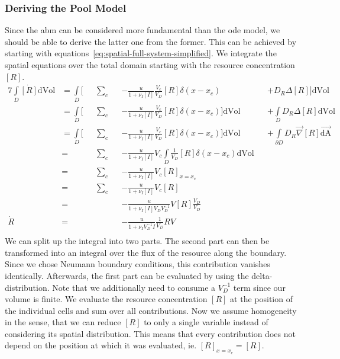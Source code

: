 \documentclass[10pt,twocolumn,5p]{elsarticle}
\numberwithin{equation}{section}
\begin{document}
\subsubsection*{Deriving the Pool Model}
\label{subsec:supplement-deriving-pool-odes}
Since the \ac{abm} can be considered more fundamental than the \ac{ode} model, we should be able to derive the latter one from the former.
This can be achieved by starting with equations~\eqref{eq:spatial-full-system-simplified}.
We integrate the spatial equations over the total domain starting with the resource concentration $[R]$.
\begin{alignat}{7}
    \int\limits_D\dot{[R]}\text{dVol} 
    &= \int\limits_D\bigg[&&\sum\limits_c &&-\frac{u}{1+\nu_I [I]} \frac{V_c}{V_D} [R] \delta(x-x_c) &&+ D_R\Delta [R]\bigg]\text{dVol}\\
    &= \int\limits_D\bigg[&&\sum\limits_c &&-\frac{u}{1+\nu_I [I]} \frac{V_c}{V_D} [R] \delta(x-x_c)\bigg]\text{dVol} &&+ \int\limits_D D_R\Delta [R]\text{dVol}\\
    &= \int\limits_D\bigg[&&\sum\limits_c &&-\frac{u}{1+\nu_I [I]} \frac{V_c}{V_D} [R] \delta(x-x_c)\bigg]\text{dVol} &&+ \int\limits_{\partial D} D_R\vec{\nabla} [R]\vec{\text{dA}}\\
    &= &&\sum\limits_c &&-\frac{u}{1+\nu_I [I]} V_c \int\limits_D \frac{1}{V_D} [R] \delta(x-x_c)\text{dVol}\\
    &= &&\sum\limits_c &&-\frac{u}{1+\nu_I [I]} V_c [R]_{x=x_c}\\
    &= &&\sum\limits_c &&-\frac{u}{1+\nu_I [I]} V_c [R]\\
    &= &&&&-\frac{u}{1+\nu_I [I]V_D V_D^{-1}} V [R]\frac{V_D}{V_D}\\
    \dot{R} &= &&&&-\frac{u}{1+\nu_I V_D^{-1}I} \frac{1}{V_D} R V\\
\end{alignat}
We can split up the integral into two parts.
The second part can then be transformed into an integral over the flux of the resource along the boundary.
Since we chose Neumann boundary conditions, this contribution vanishes identically.
Afterwards, the first part can be evaluated by using the delta-distribution.
Note that we additionally need to consume a $V_D^{-1}$ term since our volume is finite.
We evaluate the resource concentration $[R]$ at the position of the individual cells and sum over all contributions.
Now we assume homogeneity in the sense, that we can reduce $[R]$ to only a single variable instead of considering its spatial distribution.
This means that every contribution does not depend on the position at which it was evaluated, ie. $[R]_{x=x_c}=[R]$.
\end{document}
